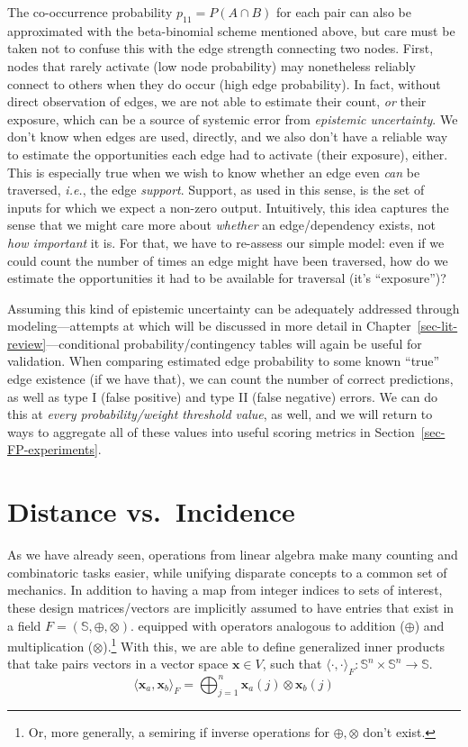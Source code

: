 \documentclass[%
	12pt,
		oneside,
		letterpaper
]{book}
\begin{document}
The co-occurrence probability \(p_{11}=P(A\cap B)\) for each pair can
also be approximated with the beta-binomial scheme mentioned above, but
care must be taken not to confuse this with the edge strength connecting
two nodes. First, nodes that rarely activate (low node probability) may
nonetheless reliably connect to others when they do occur (high edge
probability). In fact, without direct observation of edges, we are not
able to estimate their count, \emph{or} their exposure, which can be a
source of systemic error from \emph{epistemic uncertainty}. We don't
know when edges are used, directly, and we also don't have a reliable
way to estimate the opportunities each edge had to activate (their
exposure), either. This is especially true when we wish to know whether
an edge even \emph{can} be traversed, \emph{i.e.}, the edge
\emph{support}. Support, as used in this sense, is the set of inputs for
which we expect a non-zero output. Intuitively, this idea captures the
sense that we might care more about \emph{whether} an edge/dependency
exists, not \emph{how important} it is. For that, we have to re-assess
our simple model: even if we could count the number of times an edge
might have been traversed, how do we estimate the opportunities it had
to be available for traversal (it's ``exposure'')?

Assuming this kind of epistemic uncertainty can be adequately addressed
through modeling---attempts at which will be discussed in more detail in
Chapter~\ref{sec-lit-review}---conditional probability/contingency
tables will again be useful for validation. When comparing estimated
edge probability to some known ``true'' edge existence (if we have
that), we can count the number of correct predictions, as well as type I
(false positive) and type II (false negative) errors. We can do this at
\emph{every probability/weight threshold value}, as well, and we will
return to ways to aggregate all of these values into useful scoring
metrics in Section~\ref{sec-FP-experiments}.

\section{Distance vs.~Incidence}\label{sec-products}

As we have already seen, operations from linear algebra make many
counting and combinatoric tasks easier, while unifying disparate
concepts to a common set of mechanics. In addition to having a map from
integer indices to sets of interest, these design matrices/vectors are
implicitly assumed to have entries that exist in a field
\(F=(\mathbb{S},\oplus,\otimes)\). equipped with operators analogous to
addition (\(\oplus\)) and multiplication (\(\otimes\)).\footnote{ Or,
  more generally, a semiring if inverse operations for
  \(\oplus,\otimes\) don't exist.} With this, we are able to define
generalized inner products that take pairs vectors in a vector space
\(\mathbf{x}\in V\), such that
\(\langle\cdot,\cdot\rangle_F:\mathbb{S}^n\times \mathbb{S}^n\rightarrow \mathbb{S}\).
\[
\langle\mathbf{x}_a,\mathbf{x}_b\rangle_{F} = \bigoplus_{j=1}^n \mathbf{x}_a(j)\otimes\mathbf{x}_b(j)
\]
\end{document}
